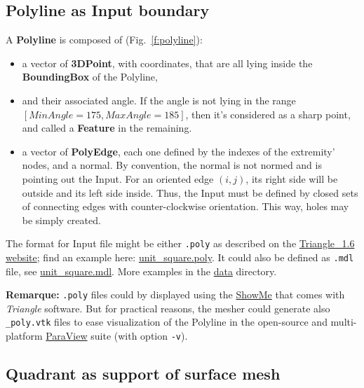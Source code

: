 \documentclass[10pt]{article}
\begin{document}
\subsection {Polyline as Input boundary}

A \textbf{Polyline} is composed of (Fig.~\ref{f:polyline}):
\begin{itemize}
\item a vector of  \textbf{3DPoint}, with coordinates, that are all lying inside the \textbf{BoundingBox} of the Polyline,
\item and their associated angle. If the angle is not lying in the range $[MinAngle=175,MaxAngle=185]$, then it's considered as a sharp point, and called  a \textbf{Feature} in the remaining.
\item a vector of \textbf{PolyEdge}, each one defined by the indexes of the extremity' nodes, and a normal. By convention, the normal is not normed and is pointing out the Input. For an oriented edge $(i,j)$, its right side will be outside and its left side inside. Thus, the Input must be defined by closed sets of connecting edges with counter-clockwise orientation. This way, holes may be simply created.
\end{itemize}
The format for Input file might be either \verb?.poly? as described on the \href{https://www.cs.cmu.edu/~quake/triangle.poly.html}{Triangle\_1.6 website}; find an example here: \href{https://github.com/jaillet/MixedQuadTree/blob/master/data/unit\_square.poly}{unit\_square.poly}.
It could also be defined as \verb?.mdl? file, see \href{https://github.com/jaillet/MixedQuadTree/blob/master/data/unit\_square.mdl}{unit\_square.mdl}. More examples in the \href{https://github.com/jaillet/MixedQuadTree/blob/master/data/}{data} directory.

\textbf{Remarque:} \texttt{.poly} files could by displayed using the \href{https://www.cs.cmu.edu/~quake/showme.html}{ShowMe}  that comes with \textit{Triangle} software. But for practical reasons, the mesher could generate also \texttt{\_poly.vtk} files to ease visualization of the Polyline in the open-source and multi-platform \href{https://www.paraview.org/}{ParaView} suite (with option \texttt{-v}).

\subsection{Quadrant as support of surface mesh}
\end{document}
